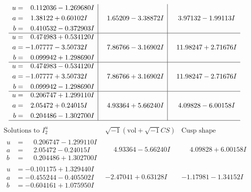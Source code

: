 \documentclass[1p]{elsarticle_modified}
\theoremstyle{definition}
\newcommand{\I}{\sqrt{-1}}
\begin{document}
$$\begin{array}{c|c|c}
\begin{aligned}
u &= \phantom{-}0.112036 - 1.269680 I \\
a &= \phantom{-}1.38122 + 0.60102 I \\
b &= \phantom{-}0.410532 - 0.372903 I\end{aligned}
 & \phantom{-}1.65209 - 3.38872 I & \phantom{-}3.97132 - 1.99113 I \\ \hline\begin{aligned}
u &= \phantom{-}0.474983 + 0.534120 I \\
a &= -1.07777 - 3.50732 I \\
b &= \phantom{-}0.099942 + 1.298690 I\end{aligned}
 & \phantom{-}7.86766 - 3.16902 I & \phantom{-}11.98247 + 2.71676 I \\ \hline\begin{aligned}
u &= \phantom{-}0.474983 - 0.534120 I \\
a &= -1.07777 + 3.50732 I \\
b &= \phantom{-}0.099942 - 1.298690 I\end{aligned}
 & \phantom{-}7.86766 + 3.16902 I & \phantom{-}11.98247 - 2.71676 I \\ \hline\begin{aligned}
u &= \phantom{-}0.206747 + 1.299110 I \\
a &= \phantom{-}2.05472 + 0.24015 I \\
b &= \phantom{-}0.204486 - 1.302700 I\end{aligned}
 & \phantom{-}4.93364 + 5.66240 I & \phantom{-}4.09828 - 6.00158 I\\
 \hline 
 \end{array}$$\newpage$$\begin{array}{c|c|c}  
\text{Solutions to }I^u_{2}& \I (\text{vol} + \sqrt{-1}CS) & \text{Cusp shape}\\
 \hline 
\begin{aligned}
u &= \phantom{-}0.206747 - 1.299110 I \\
a &= \phantom{-}2.05472 - 0.24015 I \\
b &= \phantom{-}0.204486 + 1.302700 I\end{aligned}
 & \phantom{-}4.93364 - 5.66240 I & \phantom{-}4.09828 + 6.00158 I \\ \hline\begin{aligned}
u &= -0.101175 + 1.329440 I \\
a &= -0.455244 - 0.405502 I \\
b &= -0.604161 + 1.075950 I\end{aligned}
 & -2.47041 + 0.63128 I & -1.17981 - 1.34152 I \\ \hline\begin{aligned}

\end{aligned}
\end{array}$$
\end{document}

